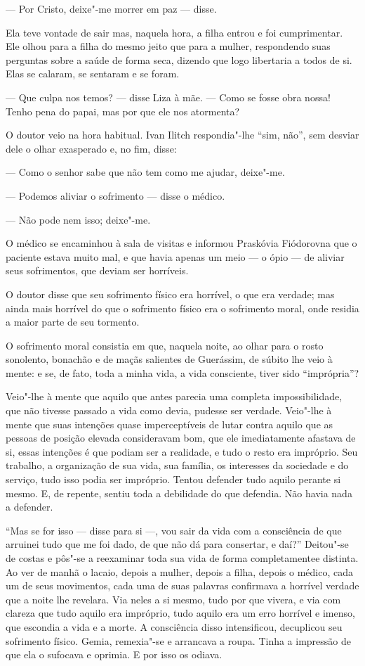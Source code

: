 --- Por Cristo, deixe"-me morrer em paz --- disse.

Ela teve vontade de sair mas, naquela hora, a filha entrou e foi
cumprimentar. Ele olhou para a filha do mesmo jeito que para a mulher,
respondendo suas perguntas sobre a saúde de forma seca, dizendo que logo
libertaria a todos de si. Elas se calaram, se sentaram e se foram.

--- Que culpa nos temos? --- disse Liza à mãe. --- Como se fosse obra nossa!
Tenho pena do papai, mas por que ele nos atormenta?

O doutor veio na hora habitual. Ivan Ilitch respondia"-lhe ``sim, não'',
sem desviar dele o olhar exasperado e, no fim, disse:

--- Como o senhor sabe que não tem como me ajudar, deixe"-me.

--- Podemos aliviar o sofrimento --- disse o médico.

--- Não pode nem isso; deixe"-me.

O médico se encaminhou à sala de visitas e informou Praskóvia Fiódorovna
que o paciente estava muito mal, e que havia apenas um meio --- o ópio ---
de aliviar seus sofrimentos, que deviam ser horríveis.

O doutor disse que seu sofrimento físico era horrível, o que era
verdade; mas ainda mais horrível do que o sofrimento físico era o
sofrimento moral, onde residia a maior parte de seu tormento.

O sofrimento moral consistia em que, naquela noite, ao olhar para o
rosto sonolento, bonachão e de maçãs salientes de Guerássim, de súbito
lhe veio à mente: e se, de fato, toda a minha vida, a vida consciente,
tiver sido ``imprópria''?

Veio"-lhe à mente que aquilo que antes parecia uma completa
impossibilidade, que não tivesse passado a vida como devia, pudesse ser
verdade. Veio"-lhe à mente que suas intenções quase imperceptíveis de
lutar contra aquilo que as pessoas de posição elevada consideravam bom,
que ele imediatamente afastava de si, essas intenções é que podiam ser a
realidade, e tudo o resto era impróprio. Seu trabalho, a organização de
sua vida, sua família, os interesses da sociedade e do serviço, tudo
isso podia ser impróprio. Tentou defender tudo aquilo perante si mesmo.
E, de repente, sentiu toda a debilidade do que defendia. Não havia nada
a defender.

``Mas se for isso --- disse para si ---, vou sair da vida com a consciência
de que arruinei tudo que me foi dado, de que não dá para consertar, e
daí?'' Deitou"-se de costas e pôs"-se a reexaminar toda sua vida de forma
completamentee distinta. Ao ver de manhã o lacaio, depois a mulher,
depois a filha, depois o médico, cada um de seus movimentos, cada uma de
suas palavras confirmava a horrível verdade que a noite lhe revelara.
Via neles a si mesmo, tudo por que vivera, e via com clareza que tudo
aquilo era impróprio, tudo aquilo era um erro horrível e imenso, que
escondia a vida e a morte. A consciência disso intensificou, decuplicou
seu sofrimento físico. Gemia, remexia"-se e arrancava a roupa. Tinha a
impressão de que ela o sufocava e oprimia. E por isso os odiava.

